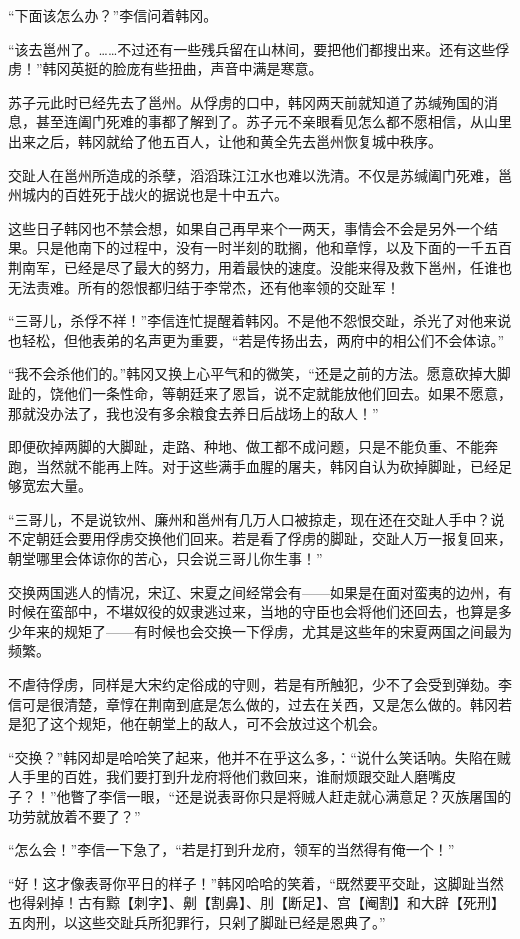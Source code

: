 “下面该怎么办？”李信问着韩冈。

“该去邕州了。……不过还有一些残兵留在山林间，要把他们都搜出来。还有这些俘虏！”韩冈英挺的脸庞有些扭曲，声音中满是寒意。

苏子元此时已经先去了邕州。从俘虏的口中，韩冈两天前就知道了苏缄殉国的消息，甚至连阖门死难的事都了解到了。苏子元不亲眼看见怎么都不愿相信，从山里出来之后，韩冈就给了他五百人，让他和黄全先去邕州恢复城中秩序。

交趾人在邕州所造成的杀孽，滔滔珠江江水也难以洗清。不仅是苏缄阖门死难，邕州城内的百姓死于战火的据说也是十中五六。

这些日子韩冈也不禁会想，如果自己再早来个一两天，事情会不会是另外一个结果。只是他南下的过程中，没有一时半刻的耽搁，他和章惇，以及下面的一千五百荆南军，已经是尽了最大的努力，用着最快的速度。没能来得及救下邕州，任谁也无法责难。所有的怨恨都归结于李常杰，还有他率领的交趾军！

“三哥儿，杀俘不祥！”李信连忙提醒着韩冈。不是他不怨恨交趾，杀光了对他来说也轻松，但他表弟的名声更为重要，“若是传扬出去，两府中的相公们不会体谅。”

“我不会杀他们的。”韩冈又换上心平气和的微笑，“还是之前的方法。愿意砍掉大脚趾的，饶他们一条性命，等朝廷来了恩旨，说不定就能放他们回去。如果不愿意，那就没办法了，我也没有多余粮食去养日后战场上的敌人！”

即便砍掉两脚的大脚趾，走路、种地、做工都不成问题，只是不能负重、不能奔跑，当然就不能再上阵。对于这些满手血腥的屠夫，韩冈自认为砍掉脚趾，已经足够宽宏大量。

“三哥儿，不是说钦州、廉州和邕州有几万人口被掠走，现在还在交趾人手中？说不定朝廷会要用俘虏交换他们回来。若是看了俘虏的脚趾，交趾人万一报复回来，朝堂哪里会体谅你的苦心，只会说三哥儿你生事！”

交换两国逃人的情况，宋辽、宋夏之间经常会有——如果是在面对蛮夷的边州，有时候在蛮部中，不堪奴役的奴隶逃过来，当地的守臣也会将他们还回去，也算是多少年来的规矩了——有时候也会交换一下俘虏，尤其是这些年的宋夏两国之间最为频繁。

不虐待俘虏，同样是大宋约定俗成的守则，若是有所触犯，少不了会受到弹劾。李信可是很清楚，章惇在荆南到底是怎么做的，过去在关西，又是怎么做的。韩冈若是犯了这个规矩，他在朝堂上的敌人，可不会放过这个机会。

“交换？”韩冈却是哈哈笑了起来，他并不在乎这么多，：“说什么笑话呐。失陷在贼人手里的百姓，我们要打到升龙府将他们救回来，谁耐烦跟交趾人磨嘴皮子？！”他瞥了李信一眼，“还是说表哥你只是将贼人赶走就心满意足？灭族屠国的功劳就放着不要了？”

“怎么会！”李信一下急了，“若是打到升龙府，领军的当然得有俺一个！”

“好！这才像表哥你平日的样子！”韩冈哈哈的笑着，“既然要平交趾，这脚趾当然也得剁掉！古有黥【刺字】、劓【割鼻】、刖【断足】、宫【阉割】和大辟【死刑】五肉刑，以这些交趾兵所犯罪行，只剁了脚趾已经是恩典了。”

